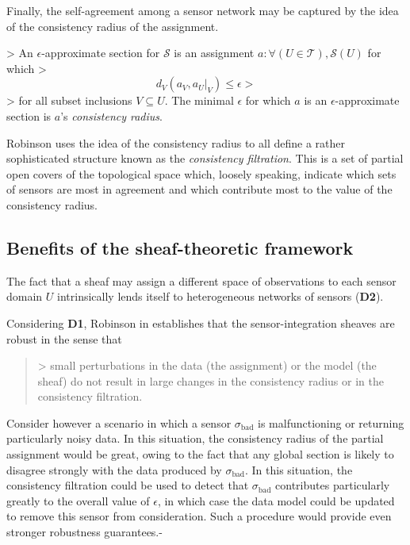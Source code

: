 Finally, the self-agreement among a sensor network may be captured by the idea of the consistency radius of the assignment.

\begin{definition}
>   An $\epsilon$-approximate section for $\mathcal{S}$ is an assignment $a : \forall (U \in \mathcal{T}), \mathcal{S}(U)$ for which
>   \[d_V(a_V, a_U|_V) \leq \epsilon
>   \]
>   for all subset inclusions $V \subseteq U$. The minimal $\epsilon$ for which $a$ is an $\epsilon$-approximate section is $a$'s \emph{consistency radius}.
\end{definition}


Robinson uses the idea of the consistency radius to all define a rather sophisticated structure known as the \emph{consistency filtration}. This is a set of partial open covers of the topological space which, loosely speaking, indicate which sets of sensors are most in agreement and which contribute most to the value of the consistency radius.

\subsection{Benefits of the sheaf-theoretic framework}

The fact that a sheaf may assign a different space of observations to each sensor domain $U$ intrinsically lends itself to heterogeneous networks of sensors (\textbf{D2}).

Considering \textbf{D1}, Robinson in \cite{2020robinsonPseudometric} establishes that the sensor-integration sheaves are robust in the sense that
\begin{quote}
>   small perturbations in the data (the assignment) or the model (the sheaf) do not result in large changes in the consistency radius or in the consistency filtration.
\end{quote}
Consider however a scenario in which a sensor $\sigma_\textrm{bad}$ is malfunctioning or returning particularly noisy data. In this situation, the consistency radius of the partial assignment would be great, owing to the fact that any global section is likely to disagree strongly with the data produced by $\sigma_\textrm{bad}$. In this situation, the consistency filtration could be used to detect that $\sigma_\textrm{bad}$ contributes particularly greatly to the overall value of $\epsilon$, in which case the data model could be updated to remove this sensor from consideration. Such a procedure would provide even stronger robustness guarantees.-

